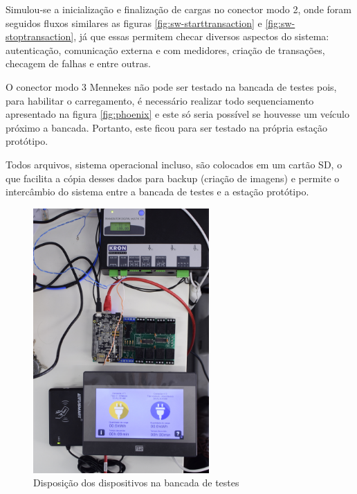     Simulou-se a inicialização e finalização de cargas no conector modo 2, onde foram seguidos fluxos similares as figuras \ref{fig:sw-starttransaction} e \ref{fig:sw-stoptransaction}, já que essas permitem checar diversos aspectos do sistema: autenticação, comunicação externa e com medidores, criação de transações, checagem de falhas e entre outras.

    O conector modo 3 Mennekes não pode ser testado na bancada de testes pois, para habilitar o carregamento, é necessário realizar todo sequenciamento apresentado na figura \ref{fig:phoenix} e este só seria possível se houvesse um veículo próximo a bancada. Portanto, este ficou para ser testado na própria estação protótipo.

    Todos arquivos, sistema operacional incluso, são colocados em um cartão SD, o que facilita a cópia desses dados para backup (criação de imagens) e permite o intercâmbio do sistema entre a bancada de testes e a estação protótipo.

    \begin{figure}[H]
      \begin{center}
        \includegraphics[width=0.6\textwidth,natwidth=2130,natheight=1420,angle=-90]{assets/images/setup-tests.jpg}
        \caption{Disposição dos dispositivos na bancada de testes}
        \label{fig:setup-tests}
      \end{center}
    \end{figure}

